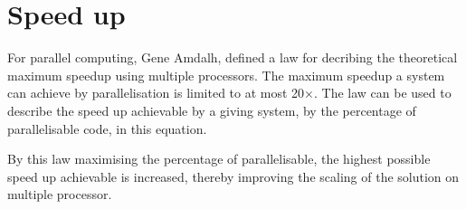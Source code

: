 \section{Speed up}
\label{sup}
  For parallel computing, Gene Amdalh, defined a law for decribing the theoretical maximum speedup using multiple processors. The maximum speedup a system can achieve by parallelisation is limited to at most 20×.
  The law can be used to describe the speed up achievable by a giving system, by the percentage of parallelisable code, in this equation.

  By this law maximising the percentage of parallelisable, the highest possible speed up achievable is increased, thereby improving the scaling of the solution on multiple processor.
